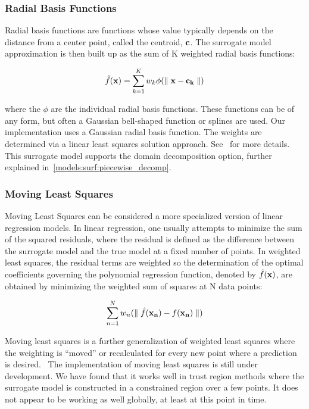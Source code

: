 \subsubsection{Radial Basis Functions}\label{models:surf:rbf}

Radial basis functions are functions whose value typically depends on the 
distance from a center point, called the centroid, ${\bf c}$. 
The surrogate model approximation is then built up as the sum of K 
weighted radial basis functions: 

\begin{equation}
  \hat{f}({\bf x})=\sum_{k=1}^{K}w_{k}\phi({\parallel {\bf x} - {\bf c_{k}} \parallel})
  \label{models:surf:equation11}  
\end{equation}

where the $\phi$ are the individual radial basis functions.  
These functions can be of any form, but often a Gaussian bell-shaped 
function or splines are used.  
Our implementation uses a Gaussian radial basis function. 
The weights are determined via a linear least squares solution approach.
See~\cite{Orr96} for more details.
This surrogate model supports the domain decomposition option, further explained in~\ref{models:surf:piecewise_decomp}.

\subsubsection{Moving Least Squares}\label{models:surf:mls}

Moving Least Squares can be considered a more specialized 
version of linear regression models.  In linear regression, 
one usually attempts to minimize the sum of the squared residuals, 
where the residual is defined as the difference between the 
surrogate model and the true model at a fixed number of points. 
In weighted least squares, the residual terms are weighted so the 
determination of the optimal coefficients governing the polynomial 
regression function, denoted by $\hat{f}({\bf x})$, are obtained by 
minimizing the weighted sum of squares at N data points: 

\begin{equation}
  \sum_{n=1}^{N}w_{n}({\parallel \hat{f}({\bf x_{n}})-f({\bf x_{n}})\parallel})
  \label{models:surf:equation12}  
\end{equation}

Moving least squares is a further generalization of weighted least squares
where the weighting is ``moved'' or recalculated for every new point where 
a prediction is desired.~\cite{Nea04}  The implementation of 
moving least squares 
is still under development.  We have found that it works well 
in trust region methods where the surrogate model is constructed in 
a constrained region over a few points.  It does not appear to be working 
as well globally, at least at this point in time.

